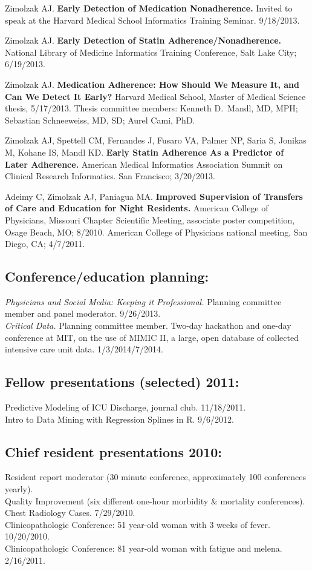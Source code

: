 \documentclass[12pt]{article}
\begin{document}
Zimolzak AJ. \textbf{Early Detection of Medication Nonadherence.}
Invited to speak at the Harvard Medical School Informatics Training
Seminar. 9/18/2013.

Zimolzak AJ. \textbf{Early Detection of Statin
  Adherence/Nonadherence.} National Library of Medicine Informatics
Training Conference, Salt Lake City; 6/19/2013.

Zimolzak AJ. \textbf{Medication Adherence: How Should We Measure It, and Can
We Detect It Early?} Harvard Medical School, Master of Medical Science
thesis, 5/17/2013. Thesis committee members: Kenneth D.\ Mandl, MD,
MPH; Sebastian Schneeweiss, MD, SD; Aurel Cami, PhD.

Zimolzak AJ, Spettell CM, Fernandes J, Fusaro VA, Palmer NP, Saria S,
Jonikas M, Kohane IS, Mandl KD. \textbf{Early Statin
  Adherence As a Predictor of Later Adherence.} American Medical
Informatics Association Summit on Clinical Research Informatics. San
Francisco; 3/20/2013.

Adeimy C, Zimolzak AJ, Paniagua MA. \textbf{Improved Supervision of
  Transfers of Care and Education for Night Residents.} American
College of Physicians, Missouri Chapter Scientific Meeting, associate
poster competition, Osage Beach, MO; 8/2010. American College of
Physicians national meeting, San Diego, CA; 4/7/2011.

\subsection*{Conference/education planning:}
\emph{Physicians and Social Media: Keeping it Professional.} Planning
committee member and panel moderator. 9/26/2013.\\
\emph{Critical Data.} Planning committee member. Two-day hackathon and
one-day conference at MIT, on the use of MIMIC II, a large, open
database of collected intensive care unit data.
1/3/2014\ndash{}/7/2014.

\subsection*{Fellow presentations (selected) 2011:}
Predictive Modeling of ICU Discharge, journal club. 11/18/2011.\\
Intro to Data Mining with Regression Splines in R. 9/6/2012.

\subsection*{Chief resident presentations 2010:}
Resident report moderator (30 minute conference, approximately 100
conferences yearly).\\
Quality Improvement (six different one-hour morbidity \& mortality
conferences).\\
Chest Radiology Cases. 7/29/2010.\\
Clinicopathologic Conference: 51 year-old woman with 3 weeks of fever.
10/20/2010.\\
Clinicopathologic Conference: 81 year-old woman with fatigue and
melena. 2/16/2011.
\end{document}

